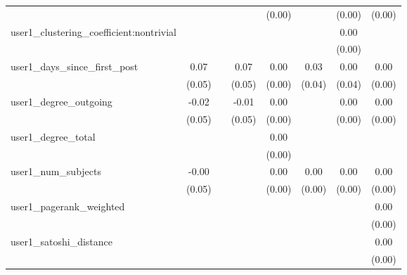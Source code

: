 \begin{table}
\begin{center}
\begin{tabular}{lccccccc}
                                               &          &            &         & (0.00)  &          & (0.00)             & (0.00)   \\
user1_clustering_coefficient:nontrivial        &          &            &         &         &          & 0.00               &          \\
                                               &          &            &         &         &          & (0.00)             &          \\
user1_days_since_first_post                    & 0.07     &            & 0.07    & 0.00    & 0.03     & 0.00               & 0.00     \\
                                               & (0.05)   &            & (0.05)  & (0.00)  & (0.04)   & (0.04)             & (0.00)   \\
user1_degree_outgoing                          & -0.02    &            & -0.01   & 0.00    &          & 0.00               & 0.00     \\
                                               & (0.05)   &            & (0.05)  & (0.00)  &          & (0.00)             & (0.00)   \\
user1_degree_total                             &          &            &         & 0.00    &          &                    &          \\
                                               &          &            &         & (0.00)  &          &                    &          \\
user1_num_subjects                             & -0.00    &            &         & 0.00    & 0.00     & 0.00               & 0.00     \\
                                               & (0.05)   &            &         & (0.00)  & (0.00)   & (0.00)             & (0.00)   \\
user1_pagerank_weighted                        &          &            &         &         &          &                    & 0.00     \\
                                               &          &            &         &         &          &                    & (0.00)   \\
user1_satoshi_distance                         &          &            &         &         &          &                    & 0.00     \\
                                               &          &            &         &         &          &                    & (0.00)   \\

\end{tabular}
\end{center}
\end{table}

